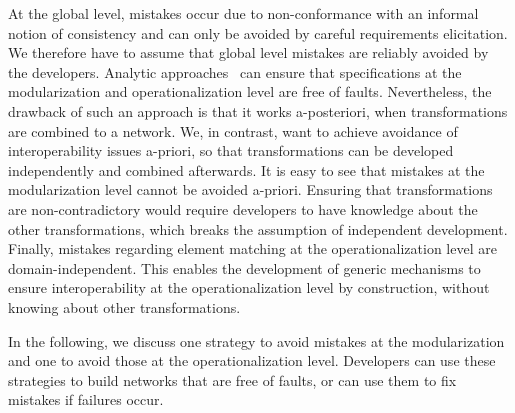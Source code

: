 At the global level, mistakes occur due to non-conformance with an informal notion of consistency and %
can only be avoided by careful requirements elicitation. 
We therefore have to assume that global level mistakes are reliably avoided by the developers.
Analytic approaches~\cite{klare2018docsym}
can ensure that specifications at the modularization and operationalization level are free of faults.
Nevertheless, %
the drawback of such an approach is that it works a-posteriori, when transformations are combined to a network. %
We, in contrast, want to achieve avoidance of interoperability issues a-priori, so that transformations can be developed independently and combined afterwards.
It is easy to see that mistakes at the modularization level cannot be avoided a-priori. 
Ensuring that transformations are non-contradictory %
would require developers to have knowledge about the other transformations, which breaks the assumption of independent development.
%
Finally, mistakes regarding element matching at the operationalization level are domain-independent. 
This enables the development of generic mechanisms to ensure interoperability at the operationalization level by construction, without knowing about other transformations.

In the following, we discuss one strategy to avoid mistakes at the modularization and one to avoid those at the operationalization level.
Developers can use these strategies to build networks that are free of faults, or can use them to fix mistakes if failures occur.
